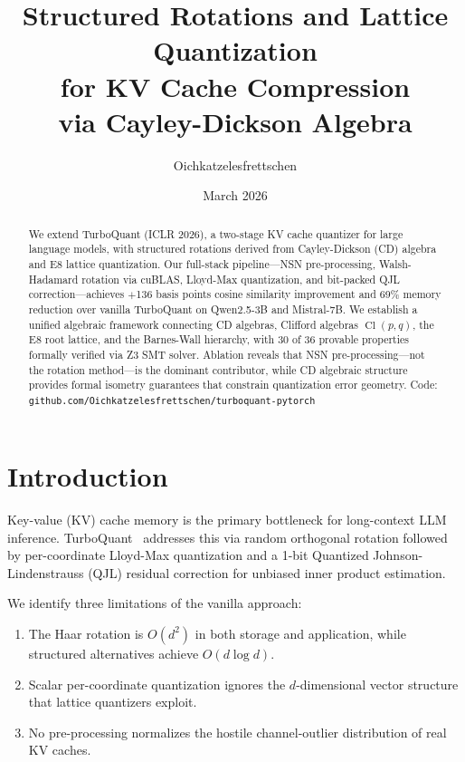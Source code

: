 \documentclass[letterpaper,11pt]{article}
\title{Structured Rotations and Lattice Quantization\\for KV Cache Compression\\via Cayley-Dickson Algebra}
\author{Oichkatzelesfrettschen}
\date{March 2026}
\DeclareMathOperator{\Cl}{Cl}
\begin{document}
\maketitle

\begin{abstract}
We extend TurboQuant (ICLR 2026), a two-stage KV cache quantizer for
large language models, with structured rotations derived from
Cayley-Dickson (CD) algebra and E8 lattice quantization.
Our full-stack pipeline---NSN pre-processing, Walsh-Hadamard rotation
via cuBLAS, Lloyd-Max quantization, and bit-packed QJL correction---achieves
$+$136 basis points cosine similarity improvement and 69\% memory reduction
over vanilla TurboQuant on Qwen2.5-3B and Mistral-7B.
We establish a unified algebraic framework connecting CD algebras,
Clifford algebras $\Cl(p,q)$, the E8 root lattice, and the
Barnes-Wall hierarchy, with 30 of 36 provable properties
formally verified via Z3 SMT solver. Ablation reveals that NSN
pre-processing---not the rotation method---is the dominant contributor,
while CD algebraic structure provides formal isometry guarantees that
constrain quantization error geometry.
Code: \texttt{github.com/Oichkatzelesfrettschen/turboquant-pytorch}
\end{abstract}

\section{Introduction}

Key-value (KV) cache memory is the primary bottleneck for long-context
LLM inference. TurboQuant~\cite{turboquant2026} addresses this via
random orthogonal rotation followed by per-coordinate Lloyd-Max
quantization and a 1-bit Quantized Johnson-Lindenstrauss (QJL)
residual correction for unbiased inner product estimation.

We identify three limitations of the vanilla approach:
\begin{enumerate}[nosep]
  \item The Haar rotation is $O(d^2)$ in both storage and application,
        while structured alternatives achieve $O(d \log d)$.
  \item Scalar per-coordinate quantization ignores the $d$-dimensional
        vector structure that lattice quantizers exploit.
  \item No pre-processing normalizes the hostile channel-outlier
        distribution of real KV caches.
\end{enumerate}
\end{document}
